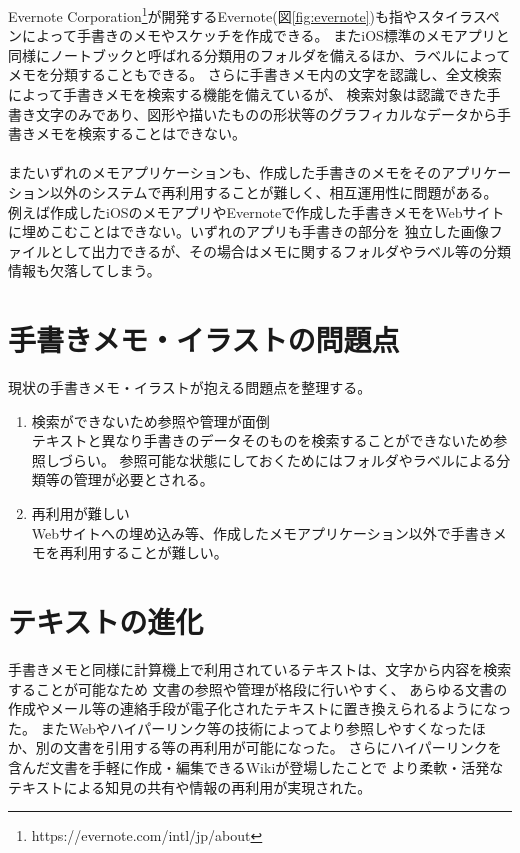 Evernote Corporation\footnote{https://evernote.com/intl/jp/about}が開発するEvernote(図\ref{fig:evernote})も指やスタイラスペンによって手書きのメモやスケッチを作成できる。
またiOS標準のメモアプリと同様にノートブックと呼ばれる分類用のフォルダを備えるほか、ラベルによってメモを分類することもできる。
さらに手書きメモ内の文字を認識し、全文検索によって手書きメモを検索する機能を備えているが、
検索対象は認識できた手書き文字のみであり、図形や描いたものの形状等のグラフィカルなデータから手書きメモを検索することはできない。
\\
\\
またいずれのメモアプリケーションも、作成した手書きのメモをそのアプリケーション以外のシステムで再利用することが難しく、相互運用性に問題がある。
例えば作成したiOSのメモアプリやEvernoteで作成した手書きメモをWebサイトに埋めこむことはできない。いずれのアプリも手書きの部分を
独立した画像ファイルとして出力できるが、その場合はメモに関するフォルダやラベル等の分類情報も欠落してしまう。


\section{手書きメモ・イラストの問題点}
\label{mondai}
現状の手書きメモ・イラストが抱える問題点を整理する。
\begin{enumerate}
    \item 検索ができないため参照や管理が面倒\\
    テキストと異なり手書きのデータそのものを検索することができないため参照しづらい。
    参照可能な状態にしておくためにはフォルダやラベルによる分類等の管理が必要とされる。
    \item 再利用が難しい\\
    Webサイトへの埋め込み等、作成したメモアプリケーション以外で手書きメモを再利用することが難しい。
\end{enumerate}

\section{テキストの進化}
手書きメモと同様に計算機上で利用されているテキストは、文字から内容を検索することが可能なため 文書の参照や管理が格段に行いやすく、
あらゆる文書の作成やメール等の連絡手段が電子化されたテキストに置き換えられるようになった。
またWebやハイパーリンク等の技術によってより参照しやすくなったほか、別の文書を引用する等の再利用が可能になった。
さらにハイパーリンクを含んだ文書を手軽に作成・編集できるWiki\cite{Leuf2001TheWW}が登場したことで
より柔軟・活発なテキストによる知見の共有や情報の再利用が実現された。


